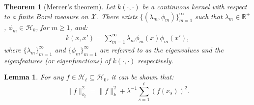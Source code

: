\documentclass[10pt,a4paper]{amsart}
\newtheorem{theorem}{Theorem}
\newtheorem{lemma}{Lemma}
\begin{document}
\begin{theorem}[Mercer's theorem]\label{thm:Mercer}
    Let $k(\cdot, \cdot)$ be a continuous kernel with respect to a finite Borel measure on $\mathcal X$. There exists $\{(\lambda_m, \phi_m)\}_{m=1}^{\infty}$ such that $\lambda_m\in \mathbb{R}^{+}$, $\phi_m\in \mathcal H_k$, for $m\geq 1$, and:
    \begin{align*}
        k(x, x') = \sum_{m=1}^{\infty}\lambda_m \phi_m(x)\phi_m(x'),
    \end{align*}
    where $\{\lambda_m\}_{m=1}^{\infty}$ and $\{\phi_m\}_{m=1}^{\infty}$ are referred to as the eigenvalues and the eigenfeatures (or eigenfunctions) of $k(\cdot, \cdot)$ respectively.
\end{theorem}

\begin{lemma}\label{lem:identity}
For any $f\in \mathcal{H}_t \subseteq \mathcal{H}_0$, it can be shown that:
$$
\|f\|_{k_{t}}^2= \|f\|_{k}^2 + \lambda^{-1}\sum_{s=1}^{t}(f(x_s))^2.
$$
\end{lemma}
\end{document}
